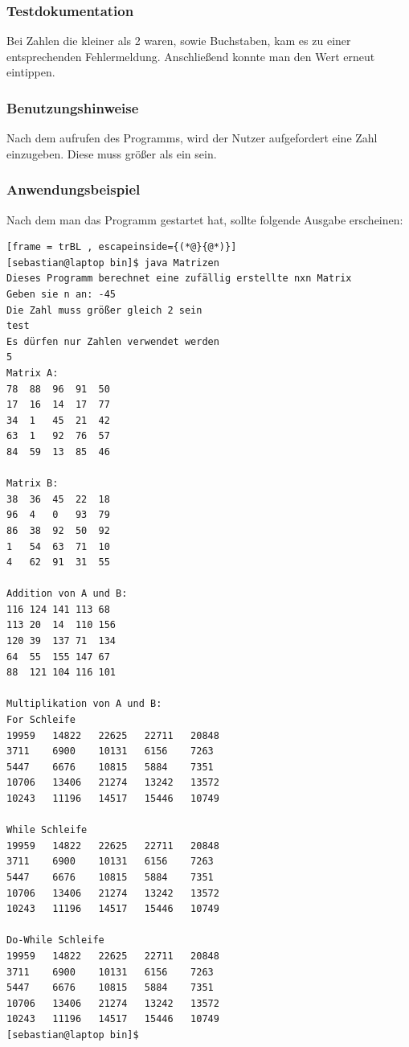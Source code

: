 \subsubsection{Testdokumentation}
Bei Zahlen die kleiner als 2 waren, sowie Buchstaben, kam es zu einer entsprechenden Fehlermeldung. Anschließend konnte man den Wert erneut eintippen.

\subsubsection{Benutzungshinweise}
Nach dem aufrufen des Programms, wird der Nutzer aufgefordert eine Zahl einzugeben.
Diese muss grö\ss er als ein sein.

\subsubsection{Anwendungsbeispiel}
Nach dem man das Programm gestartet hat, sollte folgende Ausgabe erscheinen:
\begin{lstlisting}[frame = trBL , escapeinside={(*@}{@*)}]
[sebastian@laptop bin]$ java Matrizen 
Dieses Programm berechnet eine zufällig erstellte nxn Matrix
Geben sie n an: -45
Die Zahl muss größer gleich 2 sein
test
Es dürfen nur Zahlen verwendet werden
5
Matrix A:
78	88	96	91	50	
17	16	14	17	77	
34	1	45	21	42	
63	1	92	76	57	
84	59	13	85	46	

Matrix B:
38	36	45	22	18	
96	4	0	93	79	
86	38	92	50	92	
1	54	63	71	10	
4	62	91	31	55	

Addition von A und B:
116	124	141	113	68	
113	20	14	110	156	
120	39	137	71	134	
64	55	155	147	67	
88	121	104	116	101	

Multiplikation von A und B:
For Schleife
19959	14822	22625	22711	20848	
3711	6900	10131	6156	7263	
5447	6676	10815	5884	7351	
10706	13406	21274	13242	13572	
10243	11196	14517	15446	10749	

While Schleife
19959	14822	22625	22711	20848	
3711	6900	10131	6156	7263	
5447	6676	10815	5884	7351	
10706	13406	21274	13242	13572	
10243	11196	14517	15446	10749	

Do-While Schleife
19959	14822	22625	22711	20848	
3711	6900	10131	6156	7263	
5447	6676	10815	5884	7351	
10706	13406	21274	13242	13572	
10243	11196	14517	15446	10749
[sebastian@laptop bin]$ 
\end{lstlisting}